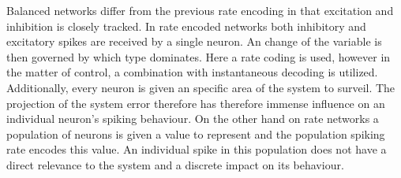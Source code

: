 Balanced networks differ from the previous rate encoding in that excitation and inhibition is closely tracked. In rate encoded networks both inhibitory and excitatory spikes are received by a single neuron. An change of the variable is then governed by which type dominates. Here a rate coding is used, however in the matter of control, a combination with instantaneous decoding is \cite{johnson_minimum-error_2016} utilized.\\
Additionally, every neuron is given an specific area of the system to surveil. The projection of the system error therefore has therefore immense influence on an individual neuron's spiking behaviour. On the other hand on rate networks a population of neurons is given a value to represent and the population spiking rate encodes this value. An individual spike in this population does not have a direct relevance to the system and a discrete impact on its behaviour.\\




